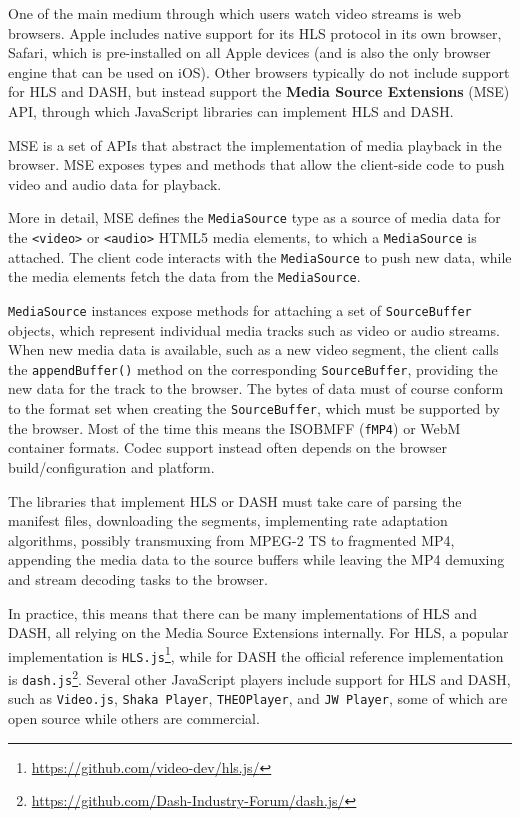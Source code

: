 One of the main medium through which users watch video streams is web browsers. Apple includes native support for its HLS protocol in its own browser, Safari, which is pre-installed on all Apple devices (and is also the only browser engine that can be used on iOS). Other browsers typically do not include support for HLS and DASH, but instead support the \textbf{Media Source Extensions} (MSE) API, through which JavaScript libraries can implement HLS and DASH.\cite{mse}

MSE is a set of APIs that abstract the implementation of media playback in the browser. MSE exposes types and methods that allow the client-side code to push video and audio data for playback.

More in detail, MSE defines the \texttt{MediaSource} type as a source of media data for the \texttt{<video>} or \texttt{<audio>} HTML5 media elements, to which a \texttt{MediaSource} is attached. The client code interacts with the \texttt{MediaSource} to push new data, while the media elements fetch the data from the \texttt{MediaSource}.

\texttt{MediaSource} instances expose methods for attaching a set of \texttt{SourceBuffer} objects, which represent individual media tracks such as video or audio streams. When new media data is available, such as a new video segment, the client calls the \texttt{appendBuffer()} method on the corresponding \texttt{SourceBuffer}, providing the new data for the track to the browser. The bytes of data must of course conform to the format set when creating the \texttt{SourceBuffer}, which must be supported by the browser. Most of the time this means the ISOBMFF (\texttt{fMP4}) or WebM container formats. Codec support instead often depends on the browser build/configuration and platform.

The libraries that implement HLS or DASH must take care of parsing the manifest files, downloading the segments, implementing rate adaptation algorithms, possibly transmuxing from MPEG-2 TS to fragmented MP4, appending the media data to the source buffers while leaving the MP4 demuxing and stream decoding tasks to the browser.

In practice, this means that there can be many implementations of HLS and DASH, all relying on the Media Source Extensions internally. For HLS, a popular implementation is \texttt{HLS.js}\footnote{\url{https://github.com/video-dev/hls.js/}}, while for DASH the official reference implementation is \texttt{dash.js}\footnote{\url{https://github.com/Dash-Industry-Forum/dash.js/}}. Several other JavaScript players include support for HLS and DASH, such as \texttt{Video.js}, \texttt{Shaka Player}, \texttt{THEOPlayer}, and \texttt{JW Player}, some of which are open source while others are commercial.

